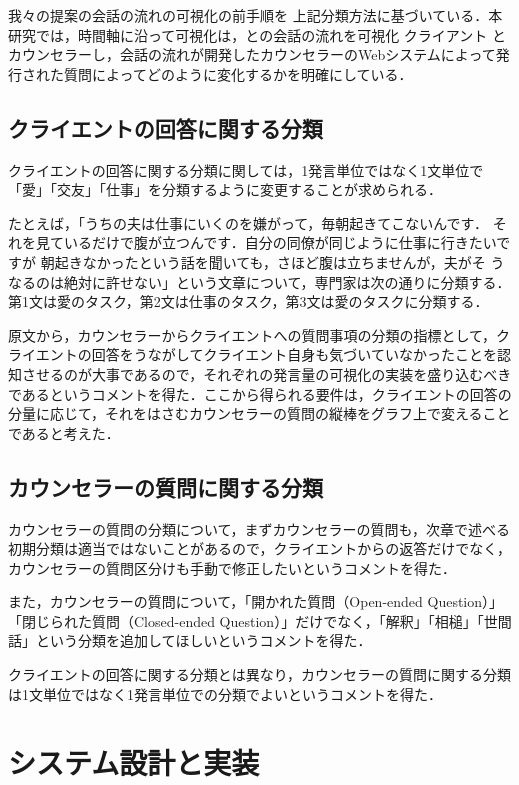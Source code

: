 \documentclass[shuuron]{kuee}
\begin{document}
我々の提案の会話の流れの可視化の前手順を 上記分類方法に基づいている．本研究では，時間軸に沿って可視化は，との会話の流れを可視化 クライアント とカウンセラーし，会話の流れが開発したカウンセラーのWebシステムによって発行された質問によってどのように変化するかを明確にしている．


\subsection{クライエントの回答に関する分類}



クライエントの回答に関する分類に関しては，1発言単位ではなく1文単位で「愛」「交友」「仕事」を分類するように変更することが求められる．

たとえば，「うちの夫は仕事にいくのを嫌がって，毎朝起きてこないんです．
それを見ているだけで腹が立つんです．自分の同僚が同じように仕事に行きたいですが
朝起きなかったという話を聞いても，さほど腹は立ちませんが，夫がそ
うなるのは絶対に許せない」という文章について，専門家は次の通りに分類する．第1文は愛のタスク，第2文は仕事のタスク，第3文は愛のタスクに分類する．

原文から，カウンセラーからクライエントへの質問事項の分類の指標として，クライエントの回答をうながしてクライエント自身も気づいていなかったことを認知させるのが大事であるので，それぞれの発言量の可視化の実装を盛り込むべきであるというコメントを得た．ここから得られる要件は，クライエントの回答の分量に応じて，それをはさむカウンセラーの質問の縦棒をグラフ上で変えることであると考えた．

\subsection{カウンセラーの質問に関する分類}

カウンセラーの質問の分類について，まずカウンセラーの質問も，次章で述べる初期分類は適当ではないことがあるので，クライエントからの返答だけでなく，カウンセラーの質問区分けも手動で修正したいというコメントを得た．

また，カウンセラーの質問について，「開かれた質問（Open-ended Question）」「閉じられた質問（Closed-ended Question）」だけでなく，「解釈」「相槌」「世間話」という分類を追加してほしいというコメントを得た．

クライエントの回答に関する分類とは異なり，カウンセラーの質問に関する分類は1文単位ではなく1発言単位での分類でよいというコメントを得た．


\section{システム設計と実装}
\end{document}
